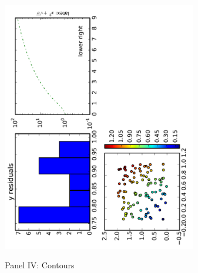 \documentclass[10pt, t]{beamer}
\begin{document}
\begin{frame}[label=sec-3-22]{\quad}
\begin{center}
\includegraphics[angle=-90,width=8.5cm]{./figures/plot_scatter.pdf}
\end{center}
\end{frame}
\begin{frame}[label=sec-3-23]{Panel IV: Contours}

\end{frame}
\end{document}
